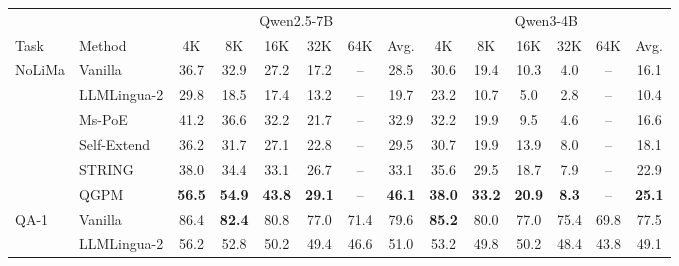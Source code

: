 \documentclass[11pt]{article}
\begin{document}
\begin{table}[t]
\centering
\small
\setlength{\tabcolsep}{3pt}
\begin{tabular*}{\textwidth}{@{\extracolsep{\fill}} ll cccccc @{\hspace{10pt}} cccccc @{}}
\toprule
 & & \multicolumn{6}{c}{Qwen2.5-7B} & \multicolumn{6}{c}{Qwen3-4B} \\
\cmidrule(lr){3-8} \cmidrule(l){9-14}
Task & Method & 4K & 8K & 16K & 32K & 64K & Avg. & 4K & 8K & 16K & 32K & 64K & Avg. \\
\midrule
\multirow{6}{*}{NoLiMa} & Vanilla & \phantom{0}36.7 & \phantom{0}32.9 & \phantom{0}27.2 & \phantom{0}17.2 & -- & \phantom{0}28.5 & \phantom{0}30.6 & \phantom{0}19.4 & \phantom{0}10.3 & \phantom{00}4.0 & -- & \phantom{0}16.1 \\
 & LLMLingua-2 & \phantom{0}29.8 & \phantom{0}18.5 & \phantom{0}17.4 & \phantom{0}13.2 & -- & \phantom{0}19.7 & \phantom{0}23.2 & \phantom{0}10.7 & \phantom{00}5.0 & \phantom{00}2.8 & -- & \phantom{0}10.4 \\
 & Ms-PoE & \phantom{0}41.2 & \phantom{0}36.6 & \phantom{0}32.2 & \phantom{0}21.7 & -- & \phantom{0}32.9 & \phantom{0}32.2 & \phantom{0}19.9 & \phantom{00}9.5 & \phantom{00}4.6 & -- & \phantom{0}16.6 \\
 & Self-Extend & \phantom{0}36.2 & \phantom{0}31.7 & \phantom{0}27.1 & \phantom{0}22.8 & -- & \phantom{0}29.5 & \phantom{0}30.7 & \phantom{0}19.9 & \phantom{0}13.9 & \phantom{00}8.0 & -- & \phantom{0}18.1 \\
 & STRING & \phantom{0}38.0 & \phantom{0}34.4 & \phantom{0}33.1 & \phantom{0}26.7 & -- & \phantom{0}33.1 & \phantom{0}35.6 & \phantom{0}29.5 & \phantom{0}18.7 & \phantom{00}7.9 & -- & \phantom{0}22.9 \\
 & QGPM & \textbf{\phantom{0}56.5} & \textbf{\phantom{0}54.9} & \textbf{\phantom{0}43.8} & \textbf{\phantom{0}29.1} & -- & \textbf{\phantom{0}46.1} & \textbf{\phantom{0}38.0} & \textbf{\phantom{0}33.2} & \textbf{\phantom{0}20.9} & \textbf{\phantom{00}8.3} & -- & \textbf{\phantom{0}25.1} \\
\midrule
\multirow{6}{*}{QA-1} & Vanilla & \phantom{0}86.4 & \textbf{\phantom{0}82.4} & \phantom{0}80.8 & \phantom{0}77.0 & \phantom{0}71.4 & \phantom{0}79.6 & \textbf{\phantom{0}85.2} & \phantom{0}80.0 & \phantom{0}77.0 & \phantom{0}75.4 & \phantom{0}69.8 & \phantom{0}77.5 \\
 & LLMLingua-2 & \phantom{0}56.2 & \phantom{0}52.8 & \phantom{0}50.2 & \phantom{0}49.4 & \phantom{0}46.6 & \phantom{0}51.0 & \phantom{0}53.2 & \phantom{0}49.8 & \phantom{0}50.2 & \phantom{0}48.4 & \phantom{0}43.8 & \phantom{0}49.1 \\

\end{tabular*}
\end{table}
\end{document}
